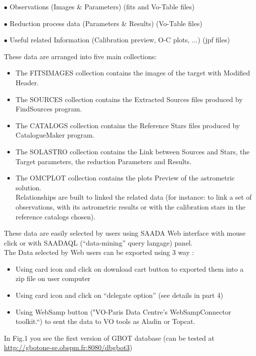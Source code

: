 \documentclass[11pt,twoside]{article}
\begin{document}
$\bullet$ Observations (Images \& Parameters) (fits and Vo-Table files)

$\bullet$ Reduction process data (Parameters \& Results) (Vo-Table files)

$\bullet$ Useful related Information (Calibration preview, O-C plots, ...) (jpf files)
\newpage

\noindent These data are arranged into five main collections: 

\begin{itemize}
\item The FITSIMAGES collection contains the images of the target with Modified Header.
\item The SOURCES collection contains the Extracted Sources files produced by FindSources program.
\item The CATALOGS collection contains the Reference Stars files produced by CatalogueMaker program.
\item The SOLASTRO collection contains the Link between Sources and Stars, the Target parameters, the reduction Parameters and Results.
\item The OMCPLOT collection contains the plots Preview of the astrometric solution.\\
Relationships are built to linked the related data (for instance: to link a set of observations, with its astrometric results or with the calibration stars in the reference catalogs chosen).
\end{itemize}

These data are easily selected by users using SAADA Web interface with mouse click or with SAADAQL (“data-mining” query langage) panel. \\
The Data selected by Web users can be exported using 3 way :\\
\begin{itemize}
\item Using card icon and click on download cart button to exported them into a zip file on user computer
\item Using card icon and click on “delegate option” (see details in part 4)
\item Using WebSamp button ("VO-Paris Data Centre's WebSampConnector toolkit.“) to sent the data to VO tools as Aladin or Topcat.
\end{itemize}
\hspace*{0.25cm}In Fig.1 you see the  first version of GBOT database (can be tested at \url{http://gbotone-se.obspm.fr:8080/dbgbot3})
\end{document}
